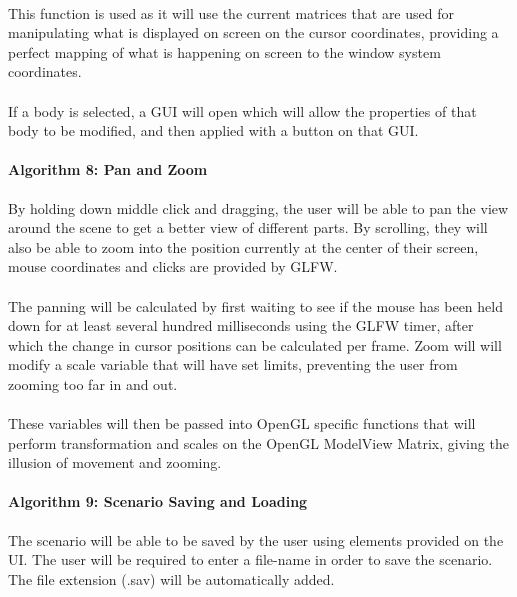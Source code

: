 \paragraph{}
This function is used as it will use the current matrices that are used for manipulating what is displayed on screen on the cursor coordinates, providing a perfect mapping of what is happening on screen to the window system coordinates.

\paragraph{}
If a body is selected, a GUI will open which will allow the properties of that body to be modified, and then applied with a button on that GUI.

\paragraph{Algorithm 8: Pan and Zoom}
By holding down middle click and dragging, the user will be able to pan the view around the scene to get a better view of different parts. By scrolling, they will also be able to zoom into the position currently at the center of their screen, mouse coordinates and clicks are provided by GLFW.

\paragraph{}
The panning will be calculated by first waiting to see if the mouse has been held down for at least several hundred milliseconds using the GLFW timer, after which the change in cursor positions can be calculated per frame. Zoom will will modify a scale variable that will have set limits, preventing the user from zooming too far in and out.

\paragraph{}
These variables will then be passed into OpenGL specific functions that will perform transformation and scales on the OpenGL ModelView Matrix, giving the illusion of movement and zooming.

\paragraph{Algorithm 9: Scenario Saving and Loading}
The scenario will be able to be saved by the user using elements provided on the UI. The user will be required to enter a file-name in order to save the scenario. The file extension (.sav) will be automatically added.

